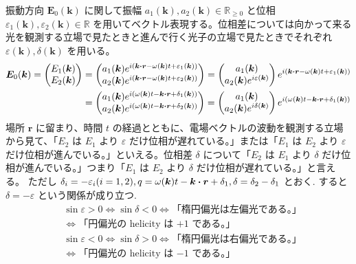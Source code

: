 \documentclass[uplatex,dvipdfmx,a4paper,11pt]{jlreq}
\newcommand{\RR}{\mathbb{R}}
\newcommand{\EE}{\bm{E}}
\newcommand{\rr}{\bm{r}}
\newcommand{\kk}{\bm{k}}
\theoremstyle{definition}
\begin{document}
\begin{definition}[偏光]
  振動方向 $\EE_0(\kk)$ に関して振幅 $a_1(\kk), a_2(\kk)\in\RR_{\geq 0}$ と位相 $\varepsilon_1(\kk), \varepsilon_2(\kk)\in\RR$ を用いてベクトル表現する。位相差については向かって来る光を観測する立場で見たときと進んで行く光子の立場で見たときでそれぞれ $\varepsilon(\kk), \delta(\kk)$ を用いる。
  \begin{align}
    \EE_0(\kk)
    = \begin{pmatrix}
        E_1(\kk) \\
        E_2(\kk)
      \end{pmatrix}
     & = \begin{pmatrix}
           a_1(\kk)e^{i(\kk\vdot\rr - \omega(\kk)t + \varepsilon_1(\kk))} \\
           a_2(\kk)e^{i(\kk\vdot\rr - \omega(\kk)t + \varepsilon_2(\kk))}
         \end{pmatrix}
    =
    \begin{pmatrix}
      a_1(\kk) \\
      a_2(\kk)e^{i\varepsilon(\kk)}
    \end{pmatrix}e^{i(\kk\vdot\rr - \omega(\kk)t + \varepsilon_1(\kk))}                  \\
     & =
    \begin{pmatrix}
      a_1(\kk)e^{i(\omega(\kk)t - \kk\vdot\rr + \delta_1(\kk))} \\
      a_2(\kk)e^{i(\omega(\kk)t - \kk\vdot\rr + \delta_2(\kk))}
    \end{pmatrix}
    =
    \begin{pmatrix}
      a_1(\kk) \\
      a_2(\kk)e^{i\delta(\kk)}
    \end{pmatrix}e^{i(\omega(\kk)t - \kk\vdot\rr + \delta_1(\kk))}
  \end{align}
  場所 $\rr$ に留まり、時間 $t$ の経過とともに、電場ベクトルの波動を観測する立場から見て、「$E_2$ は $E_1$ より $\varepsilon$ だけ位相が遅れている。」または「$E_1$ は $E_2$ より $\varepsilon$ だけ位相が進んでいる。」といえる。位相差 $\delta$ について「$E_2$ は $E_1$ より $\delta$ だけ位相が進んでいる。」つまり「$E_1$ は $E_2$ より $\delta$ だけ位相が遅れている。」と言える。
  ただし $\delta_i = - \varepsilon_i (i = 1, 2), q = \omega(\kk)t - \kk\vdot\rr + \delta_1, \delta = \delta_2 - \delta_1$ とおく. すると $\delta = -\varepsilon$ という関係が成り立つ.
  \begin{align}
     & \sin\varepsilon > 0 \iff \sin\delta < 0 \iff \text{「楕円偏光は左偏光である。」} \\
     & \iff \text{「円偏光の helicity は $+1$ である。」}                            \\
     & \sin\varepsilon < 0 \iff \sin\delta > 0 \iff \text{「楕円偏光は右偏光である。」} \\
     & \iff \text{「円偏光の helicity は $-1$ である。」}
  \end{align}
\end{definition}
\end{document}
